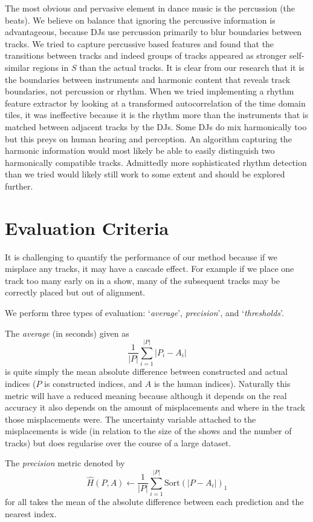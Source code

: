 \documentclass[twocolumn]{article}
\begin{document}
The most obvious and pervasive element in dance music is the percussion (the beats). We believe on balance that ignoring the percussive information is advantageous, because DJs use percussion primarily to blur boundaries between tracks.  We tried to capture percussive based features and found that the transitions between tracks and indeed groups of tracks appeared as stronger self-similar regions in $S$ than the actual tracks. It is clear from our research that it is the boundaries between instruments and harmonic content that reveals track boundaries, not percussion or rhythm. When we tried implementing a rhythm feature extractor by looking at a transformed autocorrelation of the time domain tiles, it was ineffective because it is the rhythm more than the instruments that is matched between adjacent tracks by the DJs. Some DJs do mix harmonically too but this preys on human hearing and perception. An algorithm capturing the harmonic information would most likely be able to easily distinguish two harmonically compatible tracks. Admittedly more sophisticated rhythm detection than we tried would likely still work to some extent and should be explored further. 


\section{Evaluation Criteria}\label{eval_crit}

It is challenging to quantify the performance of our method because if we misplace any tracks, it may have a cascade effect. For example if we place one track too many early on in a show, many of the subsequent tracks may be correctly placed but out of alignment. 

We perform three types of evaluation: `\textit{average}', \textit{precision}', and `\textit{thresholds}'.


The \textit{average} (in seconds) given as $$\frac{1}{|P|}\sum_{i=1}^{|P|}{|P_i-A_i|}$$ is quite simply the mean absolute difference between constructed and actual indices ($P$ is constructed indices, and $A$ is the human indices). Naturally this metric will have a reduced meaning because although it depends on the real accuracy it also depends on the amount of misplacements and where in the track those misplacements were. The uncertainty variable attached to the misplacements is wide (in relation to the size of the shows and the number of tracks) but does regularise over the course of a large dataset.


The \textit{precision} metric denoted by 
\[
\hat H(P,A) \leftarrow \frac{1}{|P|} \sum_{i=1}^{|P|}{    \mathrm{Sort}\left( |P-A_i|\right)_1   } \] for all
 takes the mean of the absolute difference between each prediction and the nearest index.
 
\end{document}
